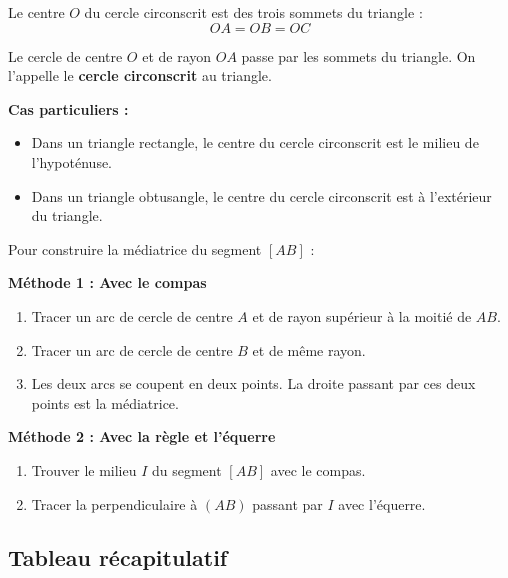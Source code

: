 \begin{proprietebox}
	Le centre $O$ du cercle circonscrit est  des trois sommets du triangle :
	$$OA = OB = OC$$

	Le cercle de centre $O$ et de rayon $OA$ passe par les  sommets du triangle. On l'appelle le \textbf{cercle circonscrit} au triangle.
\end{proprietebox}

\begin{remarkbox}
	\textbf{Cas particuliers :}
	\begin{itemize}
		\item Dans un triangle rectangle, le centre du cercle circonscrit est le milieu de l'hypoténuse.
		\item Dans un triangle obtusangle, le centre du cercle circonscrit est à l'extérieur du triangle.
	\end{itemize}
\end{remarkbox}

\begin{methodebox}
	Pour construire la médiatrice du segment $[AB]$ :

	\textbf{Méthode 1 : Avec le compas}
	\begin{enumerate}
		\item Tracer un arc de cercle de centre $A$ et de rayon supérieur à la moitié de $AB$.
		\item Tracer un arc de cercle de centre $B$ et de même rayon.
		\item Les deux arcs se coupent en deux points. La droite passant par ces deux points est la médiatrice.
	\end{enumerate}

	\textbf{Méthode 2 : Avec la règle et l'équerre}
	\begin{enumerate}
		\item Trouver le milieu $I$ du segment $[AB]$ avec le compas.
		\item Tracer la perpendiculaire à $(AB)$ passant par $I$ avec l'équerre.
	\end{enumerate}
\end{methodebox}

\subsection{Tableau récapitulatif}

